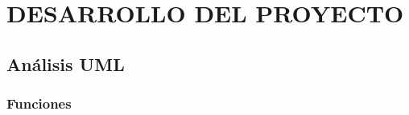\chapter{DESARROLLO DEL PROYECTO}
\section{An\'alisis UML}
\subsection{Funciones}
\addtolength{\hoffset}{-1cm}
\addtolength{\voffset}{-1cm}



